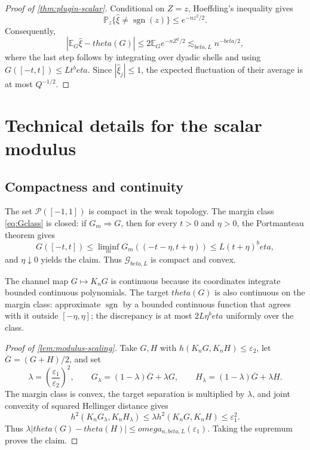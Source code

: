 \documentclass[11pt]{article}
\def\beta{beta}%
\def\theta{theta}%
\def\omega{omega}%
\newcommand{\Pp}{\mathbb P}
\newcommand{\E}{\mathbb E}
\newcommand{\sgn}{\operatorname{sgn}}
\newcommand{\calG}{\mathcal G}
\newcommand{\eps}{\varepsilon}
\begin{document}
\begin{proof}[Proof of \cref{thm:plugin-scalar}]
Conditional on $Z=z$, Hoeffding's inequality gives
\[
\Pp_z\{\widehat\xi\ne\sgn(z)\}
\le e^{-nz^2/2}.
\]
Consequently,
\[
|\E_G\widehat\xi-\theta(G)|
\le2\E_G e^{-nZ^2/2}
\lesssim_{\beta,L}n^{-\beta/2},
\]
where the last step follows by integrating over dyadic shells and using $G([-t,t])\le Lt^\beta$.  Since $|\widehat\xi_j|\le1$, the expected fluctuation of their average is at most $Q^{-1/2}$.
\end{proof}

\section{Technical details for the scalar modulus}
\label{app:scalar-modulus}

\subsection{Compactness and continuity}

The set $\mathcal P([-1,1])$ is compact in the weak topology.  The margin class \eqref{eq:Gclass} is closed: if $G_m\Rightarrow G$, then for every $t>0$ and $\eta>0$, the Portmanteau theorem gives
\[
G([-t,t])
\le
\liminf_m G_m((-t-\eta,t+\eta))
\le
L(t+\eta)^\beta,
\]
and $\eta\downarrow0$ yields the claim.  Thus $\calG_{\beta,L}$ is compact and convex.

The channel map $G\mapsto K_nG$ is continuous because its coordinates integrate bounded continuous polynomials.  The target $\theta(G)$ is also continuous on the margin class: approximate $\sgn$ by a bounded continuous function that agrees with it outside $[-\eta,\eta]$; the discrepancy is at most $2L\eta^\beta$ uniformly over the class.

\begin{proof}[Proof of \cref{lem:modulus-scaling}]
Take $G,H$ with $h(K_nG,K_nH)\le\eps_2$, let $\overline G=(G+H)/2$, and set
\[
\lambda=\left(\frac{\eps_1}{\eps_2}\right)^2,
\qquad
G_\lambda=(1-\lambda)\overline G+\lambda G,
\qquad
H_\lambda=(1-\lambda)\overline G+\lambda H.
\]
The margin class is convex, the target separation is multiplied by $\lambda$, and joint convexity of squared Hellinger distance gives
\[
h^2(K_nG_\lambda,K_nH_\lambda)
\le
\lambda h^2(K_nG,K_nH)
\le\eps_1^2.
\]
Thus $\lambda|\theta(G)-\theta(H)|\le\omega_{n,\beta,L}(\eps_1)$.  Taking the supremum proves the claim.
\end{proof}
\end{document}
